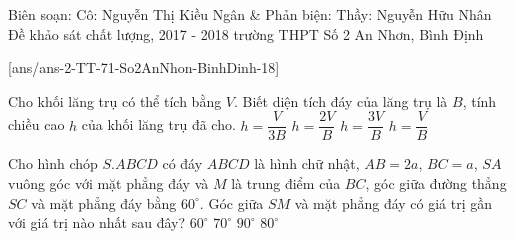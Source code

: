\begin{name}
{Biên soạn: Cô: Nguyễn Thị Kiều Ngân \& Phản biện: Thầy: Nguyễn Hữu Nhân}
{Đề khảo sát chất lượng, 2017 - 2018 trường THPT Số 2 An Nhơn, Bình Định}
\end{name}
\setcounter{ex}{0}\setcounter{bt}{0}
[ans/ans-2-TT-71-So2AnNhon-BinhDinh-18]

\begin{ex}%
	Cho khối lăng trụ có thể tích bằng $V$. Biết diện tích đáy của lăng trụ là $B$, tính chiều cao $h$ của khối lăng trụ đã cho.
	\choice
	{$h=\dfrac{V}{3B}$}
	{$h=\dfrac{2V}{B}$}
	{$h=\dfrac{3V}{B}$}
	{\True $h=\dfrac{V}{B}$}
\end{ex}

\begin{ex}%
	Cho hình chóp $S.ABCD$ có đáy $ABCD$ là hình chữ nhật, $AB=2a$, $BC=a$, $SA$ vuông góc với mặt phẳng đáy và $M$ là trung điểm của $BC$, góc giữa đường thẳng $SC$ và mặt phẳng đáy bằng $60^\circ$. Góc giữa $SM$ và mặt phẳng đáy có giá trị gần với giá trị nào nhất sau đây?
	\choice
	{\True $60^\circ$}
	{$70^\circ$}
	{$90^\circ$}
	{$80^\circ$}
\end{ex}

